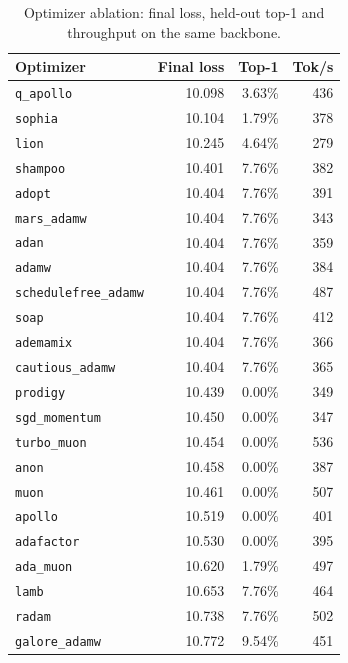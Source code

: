 \begin{table}[H]
\centering
\small
\caption{Optimizer ablation: final loss, held-out top-1 and throughput on the same backbone.}
\label{tab:r2-optimizers}
\begin{tabular}{lrrr}
\toprule
Optimizer & Final loss & Top-1 & Tok/s \\
\midrule
\texttt{q\_apollo}        & 10.098 & 3.63\% & 436 \\
\texttt{sophia}           & 10.104 & 1.79\% & 378 \\
\texttt{lion}             & 10.245 & 4.64\% & 279 \\
\texttt{shampoo}          & 10.401 & 7.76\% & 382 \\
\texttt{adopt}            & 10.404 & 7.76\% & 391 \\
\texttt{mars\_adamw}      & 10.404 & 7.76\% & 343 \\
\texttt{adan}             & 10.404 & 7.76\% & 359 \\
\texttt{adamw}            & 10.404 & 7.76\% & 384 \\
\texttt{schedulefree\_adamw} & 10.404 & 7.76\% & 487 \\
\texttt{soap}             & 10.404 & 7.76\% & 412 \\
\texttt{ademamix}         & 10.404 & 7.76\% & 366 \\
\texttt{cautious\_adamw}  & 10.404 & 7.76\% & 365 \\
\texttt{prodigy}          & 10.439 & 0.00\% & 349 \\
\texttt{sgd\_momentum}    & 10.450 & 0.00\% & 347 \\
\texttt{turbo\_muon}      & 10.454 & 0.00\% & 536 \\
\texttt{anon}             & 10.458 & 0.00\% & 387 \\
\texttt{muon}             & 10.461 & 0.00\% & 507 \\
\texttt{apollo}           & 10.519 & 0.00\% & 401 \\
\texttt{adafactor}        & 10.530 & 0.00\% & 395 \\
\texttt{ada\_muon}        & 10.620 & 1.79\% & 497 \\
\texttt{lamb}             & 10.653 & 7.76\% & 464 \\
\texttt{radam}            & 10.738 & 7.76\% & 502 \\
\texttt{galore\_adamw}    & 10.772 & 9.54\% & 451 \\
\bottomrule
\end{tabular}
\end{table}

